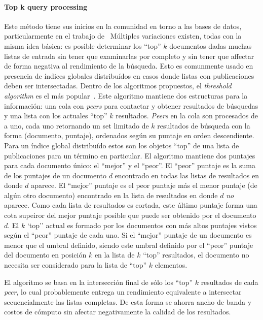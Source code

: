 \paragraph{Top k query processing~\cite{suel2003odissea, balke2005progressive, michel2005klee, zhang2005efficient}} %
Este método tiene sus inicios en la comunidad en torno a las bases de datos,
particularmente en el trabajo de~\citealt{fagin2001optimal} %
Múltiples variaciones existen, todas con la misma idea básica: es posible
determinar los ``top'' $k$ documentos dadas muchas listas de entrada sin tener
que examinarlas por completo y sin tener que affectar de forma negativa al
rendimiento de la búsqueda. Esto es comunmente usado en presencia de índices
globales distribuídos en casos donde listas con publicaciones deben ser intersectadas.
Dentro de los algoritmos propuestos, el \textit{threshold algorithm} es el más
popular~\citealt{michel2005klee, suel2003odissea}. %
Este algoritmo mantiene dos estructuras para la información: una cola con
\textit{peers} para contactar y obtener resultados de búsquedas y una lista con
los actuales ``top'' $k$ resultados. \textit{Peers} en la cola son procesados
de a uno, cada uno retornando un set limitado de $k$ resultados de búsqueda con
la forma (documento, puntaje), ordenados según su puntaje en orden descendiente.
Para un índice global distribuído estos son los objetos ``top'' de una lista de
publicaciones para un término en particular. El algoritmo mantiene dos puntajes
para cada documento único: el ``mejor'' y el ``peor''. El ``peor'' puntaje es la suma de
los puntajes de un documento $d$ encontrado en todas las listas de resultados en
donde $d$ aparece. El ``mejor'' puntaje es el peor puntaje más el menor puntaje
(de algún otro documento) encontrado en la lista de resultados en donde $d$
\textit{no} aparece. Como cada lista de resultados es cortada, este último
puntaje forma una cota supeiror del mejor puntaje posible que puede ser obtenido
por el documento $d$. El $k$ `top'' actual  es formado por los documentos con más altos
puntajes vistos según el ``peor'' puntaje de cada uno. Si el ``mejor'' puntaje
de un documento es menor que el umbral definido, siendo este umbral definido por el ``peor'' puntaje del
documento en posición $k$ en la lista de $k$ ``top'' resultados, el documento no
necesita ser considerado para la lista de ``top'' $k$ elementos.

El algoritmo se basa en la intersección final de sólo los ``top'' $k$ resultados
de cada \textit{peer}, lo cual probablemente entrega un rendimiento equivalente
a intersectar secuencialmente las listas completas. De esta forma se ahorra
ancho de banda y costos de cómputo sin afectar negativamente la calidad de los
resultados.

